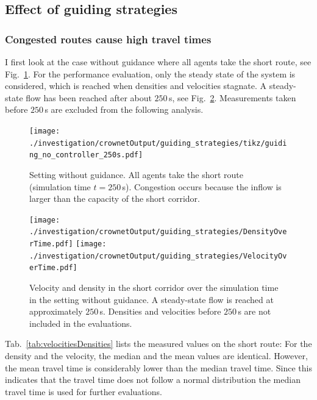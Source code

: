 \subsection{Effect of guiding strategies}



\subsubsection{Congested routes cause high travel times}

I first look at the case without guidance where all agents take the short route, see Fig.~\ref{Fig4}. For the performance evaluation, only the steady state of the system is considered, which is reached when densities and velocities stagnate. A steady-state flow has been reached  after about $250\,$s, see Fig.~\ref{Fig5}.  Measurements taken before $250\,$s are excluded from the following analysis.


\begin{figure}[hbt!]
\texttt{[image: ./investigation/crownetOutput/guiding\_strategies/tikz/guiding\_no\_controller\_250s.pdf]} 
\caption[Setting without guidance]{Setting without guidance. All agents take the short route (simulation time $t=250\,$s). Congestion occurs because the inflow is larger than the capacity of the short corridor.}
\label{Fig4}
\end{figure}



\begin{figure}[hbt!] 
\texttt{[image: ./investigation/crownetOutput/guiding\_strategies/DensityOverTime.pdf]} 
\texttt{[image: ./investigation/crownetOutput/guiding\_strategies/VelocityOverTime.pdf]} 
\caption[Velocity and density in the short corridor]{Velocity and density in the short corridor over the simulation time in the setting without guidance. 
A steady-state flow is reached at approximately $250$\,s. Densities and velocities before $250\,$s are not included in the evaluations. }
\label{Fig5}
\end{figure}

Tab.~\ref{tab:velocitiesDensities} lists the measured values on the short route:
%
For the density and the velocity, the median and the mean values are identical. However, the mean travel time is considerably lower than the median travel time. Since this indicates that the travel time does not follow a normal distribution the median travel time is used for further evaluations. 
%

